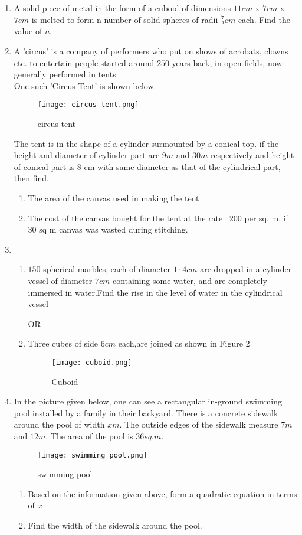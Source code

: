 \documentclass{article}
\begin{document}
\begin{enumerate}
 \item  A solid piece of metal in the form of a cuboid of dimensions $11 cm$ x $7 cm$ x $7 cm$ is melted to form n number of solid spheres of radii $\frac{7}{2}cm$ each. Find the value of $n$.
\newpage     
\item  A 'circus' is a company of performers who put on shows of acrobats, clowns etc. to entertain people started around $250$ years back, in open fields, now generally performed in tents
\\
One such 'Circus Tent' is shown below.
 \begin{figure}[H]
 \centering
 \texttt{[image: circus tent.png]}
 \caption{circus tent}
 \label{fig:circus tent.png}
 \end{figure}
  The tent is in the shape of a cylinder surmounted by a conical top. if the height and diameter of cylinder part are $9 m$ and $30 m$ respectively and height of conical part is 8 cm with same diameter as that of the cylindrical part, then find.
    \begin{enumerate}
    \item  The area of the canvas used in making the tent
    \item  The cost of the canvas bought for the tent at the rate \rupee~200 per sq. m, if 30 sq m canvas was wasted during stitching.
    \end{enumerate}
\newpage
\item 
\begin{enumerate}
   \item $150$ spherical marbles, each of diameter $1\cdot4 cm$ are dropped in a cylinder vessel of diameter $7cm$ containing some water, and are completely immersed in water.Find the rise in the level of water in the cylindrical vessel
\begin{center}
       OR
\end{center}
\item Three cubes of side $6cm$ each,are joined as shown in Figure 2
\begin{figure}[H]
\centering
\texttt{[image: cuboid.png]}
\caption{Cuboid}
\label{fig:cuboid}
\end{figure}
\end{enumerate}

\item In the picture given below, one can see a rectangular in-ground swimming pool installed by a family in their backyard. There is a concrete sidewalk around the pool of width $x m$. The outside edges of the sidewalk measure $7 m$ and $12 m$. The area of the pool is $36 sq. m$.
\begin{figure}[H]
    \centering
    \texttt{[image: swimming pool.png]}
    \caption{swimming pool}
    \label{fig:swimming pool}
\end{figure}
\begin{enumerate}
    \item Based on the information given above, form a quadratic equation in terms of $x$
    \item Find the width of the sidewalk around the pool.
\end{enumerate}


\end{enumerate}
\end{document}
